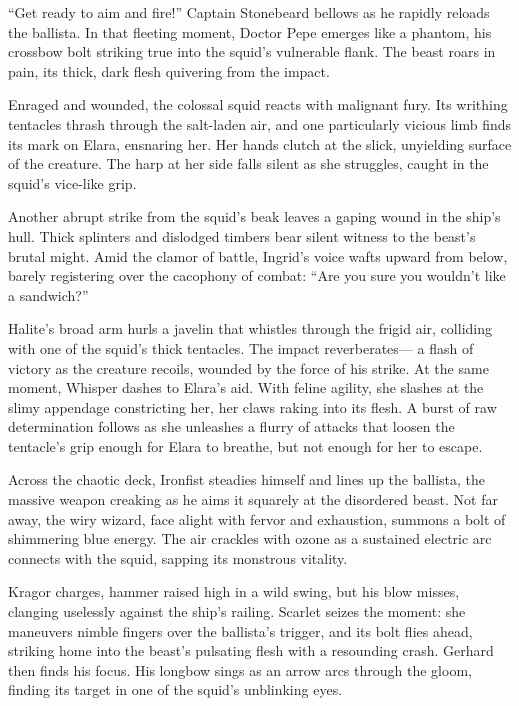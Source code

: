 \documentclass[
  letterpaper,12pt,twoside,twocolumn,openany,
  nodeprecatedcode,bg=full]{dndbook}
\begin{document}
``Get ready to aim and fire!'' Captain Stonebeard bellows as he rapidly
reloads the ballista. In that fleeting moment, Doctor Pepe emerges like
a phantom, his crossbow bolt striking true into the squid's vulnerable
flank. The beast roars in pain, its thick, dark flesh quivering from the
impact.

Enraged and wounded, the colossal squid reacts with malignant fury. Its
writhing tentacles thrash through the salt-laden air, and one
particularly vicious limb finds its mark on Elara, ensnaring her. Her
hands clutch at the slick, unyielding surface of the creature. The harp
at her side falls silent as she struggles, caught in the squid's
vice-like grip.

Another abrupt strike from the squid's beak leaves a gaping wound in the
ship's hull. Thick splinters and dislodged timbers bear silent witness
to the beast's brutal might. Amid the clamor of battle, Ingrid's voice
wafts upward from below, barely registering over the cacophony of
combat: ``Are you sure you wouldn't like a sandwich?''

Halite's broad arm hurls a javelin that whistles through the frigid air,
colliding with one of the squid's thick tentacles. The impact
reverberates--- a flash of victory as the creature recoils, wounded by
the force of his strike. At the same moment, Whisper dashes to Elara's
aid. With feline agility, she slashes at the slimy appendage
constricting her, her claws raking into its flesh. A burst of raw
determination follows as she unleashes a flurry of attacks that loosen
the tentacle's grip enough for Elara to breathe, but not enough for her
to escape.

Across the chaotic deck, Ironfist steadies himself and lines up the
ballista, the massive weapon creaking as he aims it squarely at the
disordered beast. Not far away, the wiry wizard, face alight with fervor
and exhaustion, summons a bolt of shimmering blue energy. The air
crackles with ozone as a sustained electric arc connects with the squid,
sapping its monstrous vitality.

Kragor charges, hammer raised high in a wild swing, but his blow misses,
clanging uselessly against the ship's railing. Scarlet seizes the
moment: she maneuvers nimble fingers over the ballista's trigger, and
its bolt flies ahead, striking home into the beast's pulsating flesh
with a resounding crash. Gerhard then finds his focus. His longbow sings
as an arrow arcs through the gloom, finding its target in one of the
squid's unblinking eyes.
\end{document}
